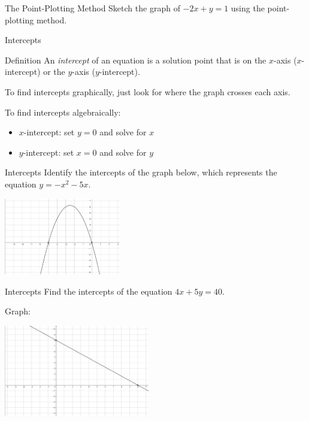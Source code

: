 \documentclass{beamer}
\begin{document}
\begin{frame}[t]{The Point-Plotting Method}
Sketch the graph of $-2x + y = 1$ using the point-plotting method.
\end{frame}

\begin{frame}[t]{Intercepts}
\begin{block}{Definition}
An \textit{intercept} of an equation is a solution point that is on the $x$-axis ($x$-intercept) or the $y$-axis ($y$-intercept).
\end{block}

\pause

To find intercepts graphically, just look for where the graph crosses each axis.

\pause

To find intercepts algebraically: \vspace{-6pt} \begin{itemize}
\item $x$-intercept: set $y = 0$ and solve for $x$
\item $y$-intercept: set $x = 0$ and solve for $y$
\end{itemize}
\end{frame}

\begin{frame}[t]{Intercepts}
Identify the intercepts of the graph below, which represents the equation $y = -x^2 - 5x$.

\includegraphics[width=2in]{GraphParabola1.png}
\end{frame}

\begin{frame}[t]{Intercepts}
Find the intercepts of the equation $4x + 5y = 40$.

\pause

Graph:

\includegraphics[width=2.5in]{GraphLine2.png}
\end{frame}
\end{document}
